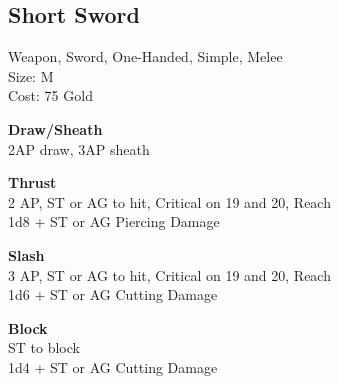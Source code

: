 \subsection{Short Sword}\label{weapon:shortSword}
Weapon, Sword, One-Handed, Simple, Melee\\
Size: M\\
Cost: 75 Gold

\textbf{Draw/Sheath}\\
2AP draw, 3AP sheath

\textbf{Thrust}\\
2 AP, ST or AG to hit, Critical on 19 and 20,  Reach\\
1d8 + \texttimes ST or AG Piercing Damage

\textbf{Slash}\\
3 AP, ST or AG to hit, Critical on 19 and 20,  Reach\\
1d6 + \texttimes ST or AG Cutting Damage

\textbf{Block}\\
ST to block\\
1d4 + \texttimes ST or AG Cutting Damage

